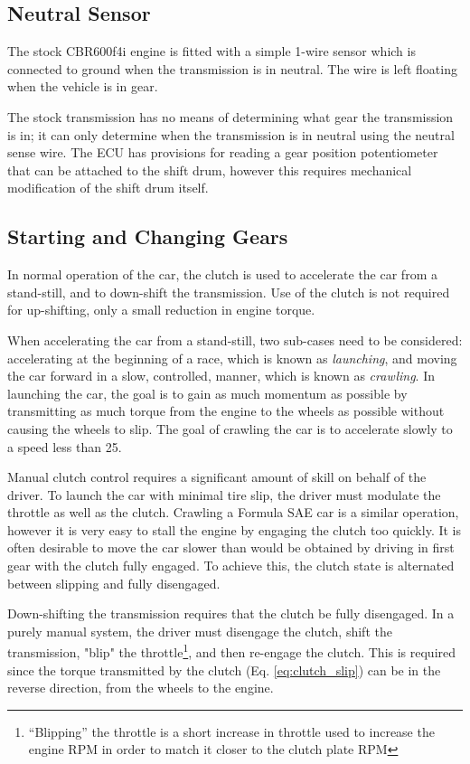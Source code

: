 \subsection{Neutral Sensor}

The stock CBR600f4i engine is fitted with a simple 1-wire sensor which is connected to ground when the transmission is in neutral. The wire is left floating when the vehicle is in gear.

The stock transmission has no means of determining what gear the transmission is in; it can only determine when the transmission is in neutral using the neutral sense wire. The ECU has provisions for reading a gear position potentiometer that can be attached to the shift drum, however this requires mechanical modification of the shift drum itself.

\subsection{Starting and Changing Gears}

In normal operation of the car, the clutch is used to accelerate the car from a stand-still, and to down-shift the transmission. Use of the clutch is not required for up-shifting, only a small reduction in engine torque.

When accelerating the car from a stand-still, two sub-cases need to be considered: accelerating at the beginning of a race, which is known as \emph{launching}, and moving the car forward in a slow, controlled, manner, which is known as \emph{crawling}. In launching the car, the goal is to gain as much momentum as possible by transmitting as much torque from the engine to the wheels as possible without causing the wheels to slip. The goal of crawling the car is to accelerate slowly to a speed less than \unit{25}{\kilo\metre\per\hour}.

Manual clutch control requires a significant amount of skill on behalf of the driver. To launch the car with minimal tire slip, the driver must modulate the throttle as well as the clutch. Crawling a Formula SAE car is a similar operation, however it is very easy to stall the engine by engaging the clutch too quickly. It is often desirable to move the car slower than would be obtained by driving in first gear with the clutch fully engaged. To achieve this, the clutch state is alternated between slipping and fully disengaged.

Down-shifting the transmission requires that the clutch be fully disengaged. In a purely manual system, the driver must disengage the clutch, shift the transmission, "blip" the throttle\footnote{``Blipping'' the throttle is a short increase in throttle used to increase the engine RPM in order to match it closer to the clutch plate RPM}, and then re-engage the clutch. This is required since the torque transmitted by the clutch (Eq. \ref{eq:clutch_slip}) can be in the reverse direction, from the wheels to the engine.

